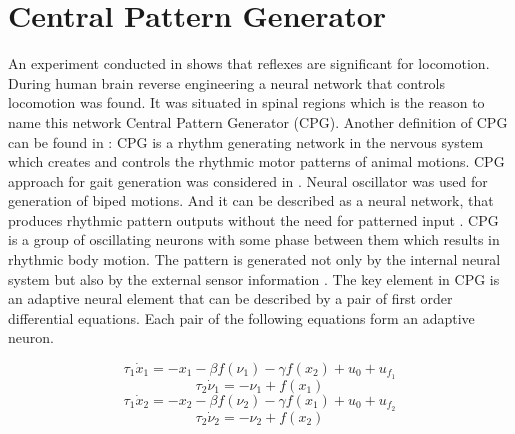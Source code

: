 \documentclass[12pt,a4paper]{report}
\begin{document}
	\section{Central Pattern Generator}

		An experiment conducted in \cite{grillner1975locomotion} shows that reflexes are significant for locomotion. During human brain reverse engineering a neural network that controls locomotion was found. It was situated in spinal regions which is the reason to name this network Central Pattern Generator (CPG).
		Another definition of CPG can be found in \cite{lee2007construction}: CPG is a rhythm generating network in the nervous system which creates and controls the rhythmic motor patterns of animal motions. CPG approach for gait generation was considered in \cite{miyakoshi1998three}. Neural oscillator was used for generation of biped motions. And it can be described as a neural network, that produces rhythmic pattern outputs without the need for patterned input \cite{wright2014intelligent}. CPG is a group of oscillating neurons with some phase between them which results in rhythmic body motion. The pattern is generated not only by the internal neural system but also by the external sensor information \cite{miyakoshi1998three}. The key element in CPG is an adaptive neural element that can be described by a pair of first order differential equations. Each pair of the following equations form an adaptive neuron.

		\begin{equation}\label{eq:CPG1}
			\tau_1 \dot{x}_1 = -x_1 - \beta f(\nu_1) -  \gamma f(x_2) + u_0 + u_{f_1}
		\end{equation}
		\begin{equation}\label{eq:CPG2}
			\tau_2 \dot{\nu}_1 = -\nu_1  + f(x_1)
		\end{equation}
		\begin{equation}\label{eq:CPG3}
			\tau_1 \dot{x}_2 = -x_2 - \beta f(\nu_2) -  \gamma f(x_1) + u_0 + u_{f_2}
		\end{equation}
		\begin{equation}\label{eq:CPG4}
			\tau_2 \dot{\nu}_2 = -\nu_2  + f(x_2)
		\end{equation}
\end{document}
